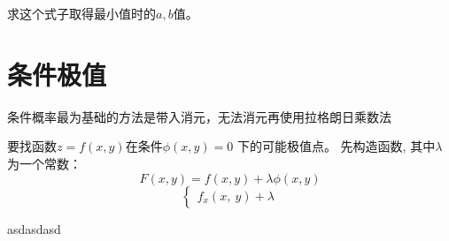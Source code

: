 \documentclass[10pt, a4paper]{article}
\begin{document}
                求这个式子取得最小值时的$a, b$值。
    \section{条件极值}
        条件概率最为基础的方法是带入消元，无法消元再使用拉格朗日乘数法

        要找函数$z = f(x, y)$在条件$\phi (x, y) = 0$ 下的可能极值点。 
        先构造函数, 其中$\lambda$为一个常数：
        $$F(x, y) = f(x, y) + \lambda \phi (x, y)$$
        \begin{equation*}
            \left\{
                \begin{aligned}
                    f_x(x,\ y) + \lambda
                \end{aligned} 
                \right.
        \end{equation*} 

        asdasdasd
\end{document}
